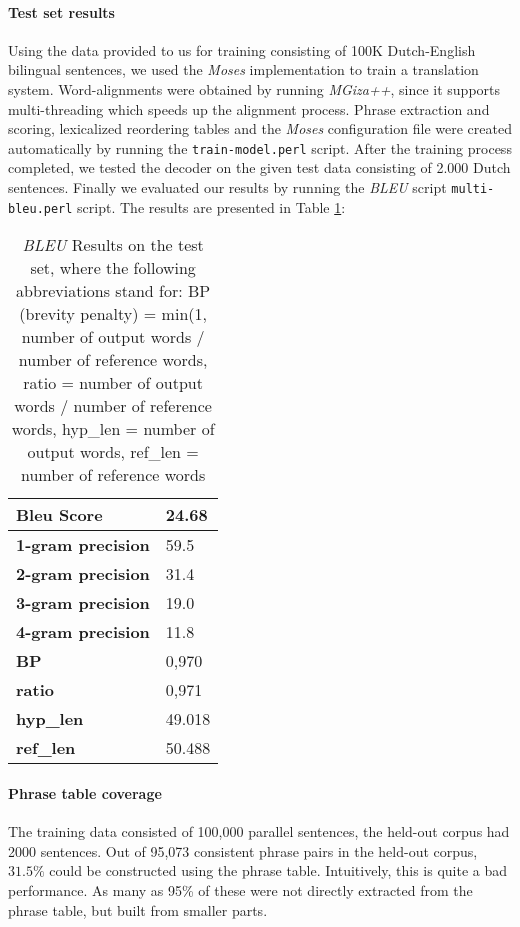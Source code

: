 \documentclass[11pt]{article}
\begin{document}
\paragraph{Test set results}
Using the data provided to us for training consisting of 100K Dutch-English bilingual sentences, we used the \textit{Moses} implementation to train a translation system. Word-alignments were obtained by running \textit{MGiza++}, since it supports multi-threading which speeds up the alignment process. Phrase extraction and scoring, lexicalized reordering tables and the \textit{Moses} configuration file were created automatically by running the \verb|train-model.perl| script. After the training process completed, we tested the decoder on the given test data consisting of 2.000 Dutch sentences. Finally we evaluated our results by running the \textit{BLEU} script \verb|multi-bleu.perl| script. The results are presented in Table \ref{bleuresults}:


\begin{table}[h]
\centering
\begin{tabular}{ l l }
  \hline \hline
  \textbf{Bleu Score} & 24.68 \\
  \hline \hline
  \textbf{1-gram precision} & 59.5 \\
  \textbf{2-gram precision} & 31.4 \\
  \textbf{3-gram precision} & 19.0 \\
  \textbf{4-gram precision} & 11.8 \\
  \hline \hline
  \textbf{BP} & 0,970 \\
  \textbf{ratio} & 0,971 \\
  \textbf{hyp\_len} & 49.018 \\
  \textbf{ref\_len} & 50.488 \\
  \hline \hline
\end{tabular}
\caption{\textit{BLEU} Results on the test set, where the following abbreviations stand for: BP (brevity penalty) = min(1, number of output words / number of reference words, ratio = number of output words / number of reference words, hyp\_len = number of output words, ref\_len = number of reference words}
\label{bleuresults}
\end{table}


\paragraph{Phrase table coverage}
The training data consisted of 100,000 parallel sentences, the held-out corpus had 2000 sentences. Out of 95,073 consistent phrase pairs in the held-out corpus, $31.5\%$ could be constructed using the phrase table. Intuitively, this is quite a bad performance. As many as 95\% of these were not directly extracted from the phrase table, but built from smaller parts.
\end{document}
